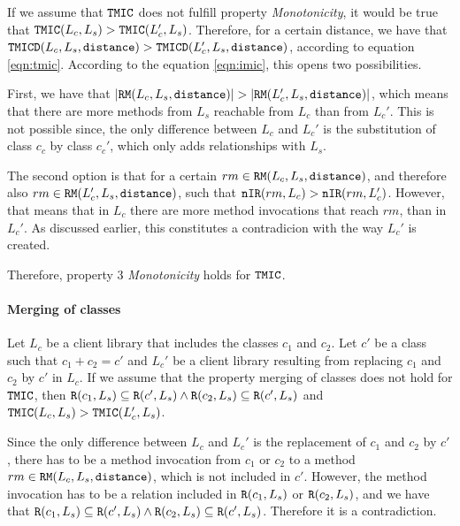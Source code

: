 If we assume that $\verb|TMIC|$ does not fulfill property \textit{Monotonicity}, it would be true that $\verb|TMIC|(L_c, L_s) > \verb|TMIC|(L_c', L_s)$. Therefore, for a certain distance, we have that $\verb|TMICD|(L_c,L_s,\verb|distance|) > \verb|TMICD|(L_c',L_s,\verb|distance|)$, according to equation \ref{eqn:tmic}. According to the equation \ref{eqn:imic}, this opens two possibilities.

First, we have that $|\verb|RM|(L_c,L_s,\verb|distance|)| > |\verb|RM|(L_c',L_s,\verb|distance|)|$, which means that there are more methods from $L_s$ reachable from $L_c$ than from $L_c'$. This is not possible since, the only difference between $L_c$ and $L_c'$ is the substitution of class $c_c$ by class $c_c'$, which only adds relationships with $L_s$.

The second option is that for a certain $rm \in \verb|RM|(L_c,L_s,\verb|distance|)$, and therefore also $rm \in \verb|RM|(L_c',L_s,\verb|distance|)$, such that   $\verb|nIR|(rm,L_c) > \verb|nIR|(rm,L_c')$. However, that means that in $L_c$ there are more method invocations that reach $rm$, than in $L_c'$. As discussed earlier, this constitutes a contradicion with the way $L_c'$ is created.

Therefore, property 3 \textit{Monotonicity} holds for $\verb|TMIC|$.

\paragraph{Merging of classes}
Let $L_c$ be a client library that includes the classes $c_1$ and $c_2$. Let $c'$ be a class such that $c_1 + c_2 = c'$ and $L_c'$ be a client library resulting from replacing $c_1$ and $c_2$ by $c'$ in $L_c$. If we assume that the property merging of classes does not hold for $\verb|TMIC|$, then $\verb|R|(c_1, L_s) \subseteq \verb|R|(c', L_s) \land \verb|R|(c_2, L_s) \subseteq \verb|R|(c', L_s)$ and $\verb|TMIC|(L_c, L_s) > \verb|TMIC|(L_c', L_s)$.

Since the only difference between $L_c$ and $L_c'$ is the replacement of $c_1$ and $c_2$ by $c'$, there has to be a method invocation from $c_1$ or $c_2$ to a method $rm \in \verb|RM|(L_c,L_s,\verb|distance|)$, which is not included in $c'$. However, the method invocation has to be a relation included in $\verb|R|(c_1, L_s)$ or $\verb|R|(c_2, L_s)$, and we have that $\verb|R|(c_1, L_s) \subseteq \verb|R|(c', L_s) \land \verb|R|(c_2, L_s) \subseteq \verb|R|(c', L_s)$. Therefore it is a contradiction.

